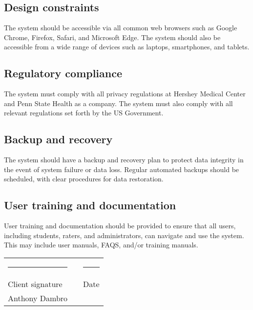 \documentclass[letterpaper,article,oneside]{memoir}
\begin{document}
\subsection{Design constraints}

The system should be accessible via all common web browsers such as Google Chrome, Firefox, Safari, and Microsoft Edge.
The system should also be accessible from a wide range of devices such as laptops, smartphones, and tablets.

\subsection{Regulatory compliance}

The system must comply with all privacy regulations at Hershey Medical Center and Penn State Health as a company.
The system must also comply with all relevant regulations set forth by the US Government.

\subsection{Backup and recovery}

The system should have a backup and recovery plan to protect data integrity in the event of system failure or data loss.
Regular automated backups should be scheduled, with clear procedures for data restoration.

\subsection{User training and documentation}

User training and documentation should be provided to ensure that all users, including students, raters, and administrators, can navigate and use the system.
This may include user manuals, FAQS, and/or training manuals.

\vfill

\vspace*{1in}
\begin{tabularx}{\textwidth}{XcX}
  \hrule           & \hspace*{3em} & \hrule \\
  Client signature &               & Date   \\
  Anthony Dambro  
\end{tabularx}

\newpage
\appendix
\addappheadtotoc

\end{document}
